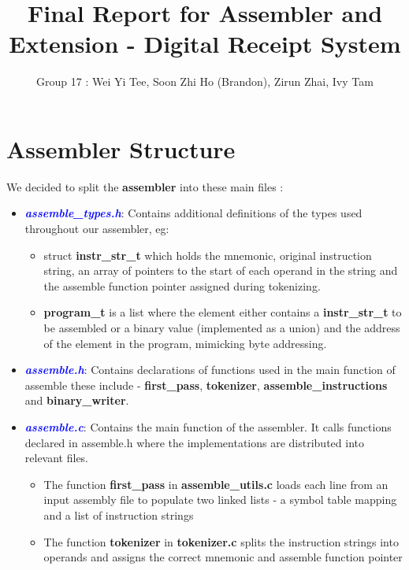 \documentclass[11pt]{article}
\begin{document}
\title{Final Report for Assembler and Extension - Digital Receipt System}
\author{Group 17 : Wei Yi Tee, Soon Zhi Ho (Brandon), Zirun Zhai, Ivy Tam}

\maketitle

\section{Assembler Structure}

We decided to split the \textbf{assembler} into these main files :

\begin{itemize}
	\item \textcolor{blue}{\textbf{\emph{assemble\_types.h}}}: Contains additional definitions of the types used throughout our assembler, eg:
	\begin{itemize}
	    \item struct {\textbf{instr\_str\_t}} which holds the mnemonic, original instruction string, an array of pointers to the start of each operand in the string and the assemble function pointer assigned during tokenizing.
	    \item {\textbf{program\_t}} is a list where the element either contains a {\textbf{instr\_str\_t}} to be assembled or a binary value (implemented as a union) and the address of the element in the program, mimicking byte addressing. 
	\end{itemize}
	\item \textcolor{blue}{\textbf{\emph{assemble.h}}}: Contains declarations of functions used in the main function of assemble these include - {\textbf{first\_pass}}, {\textbf{tokenizer}}, {\textbf{assemble\_instructions}} and {\textbf{binary\_writer}}.
	\item \textcolor{blue}{\textbf{\emph{assemble.c}}}: Contains the main function of the assembler. It calls functions declared in assemble.h where the implementations are distributed into relevant files.
	\begin{itemize}
	    \item The function {\textbf{first\_pass}} in {\textbf{assemble\_utils.c}} loads each line from an input assembly file to populate two linked lists - a symbol table mapping and a list of instruction strings
	    \item The function {\textbf{tokenizer}} in {\textbf{tokenizer.c}} splits the instruction strings into operands and assigns the correct mnemonic and assemble function pointer

\end{itemize}
\end{itemize}
\end{document}
